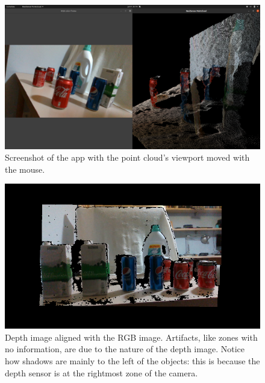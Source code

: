 \documentclass[../main.tex]{subfiles}
\begin{document}
\begin{figure}[h]
    \centering
    \includegraphics[width=1\linewidth]{images/realsense_SDK_rotated.png}
    \caption{Screenshot of the app with the point cloud's viewport moved with the mouse.}
    \label{fig:realsense_SDK_rotated}
\end{figure}

\begin{figure}[h]
    \centering
    \includegraphics[width=1\linewidth]{images/colored_depth_image.png}
    \caption{Depth image aligned with the RGB image. Artifacts, like zones with no information, are due to the nature of the depth image. Notice how shadows are mainly to the left of the objects: this is because the depth sensor is at the rightmost zone of the camera.}
    \label{fig:colored_depth_image}
\end{figure}
\end{document}
